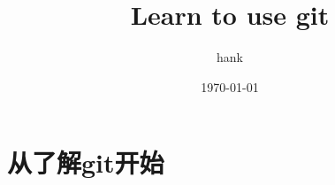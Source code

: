 \documentclass[12pt]{article}
\title{Learn to use git}
\author{hank}
\date{\today}
\begin{document}
\maketitle
\section{从了解git开始}
\end{document}

